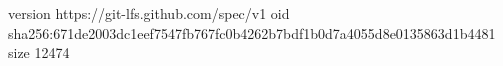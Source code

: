 version https://git-lfs.github.com/spec/v1
oid sha256:671de2003dc1eef7547fb767fc0b4262b7bdf1b0d7a4055d8e0135863d1b4481
size 12474
